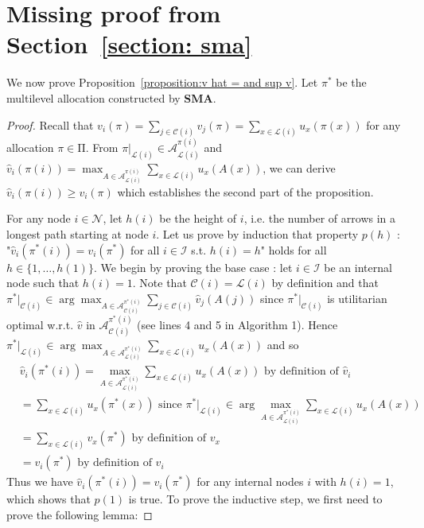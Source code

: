 \documentclass[]{article}
\newcommand{\nodes}{\mathcal{N}}
\newcommand{\children}{\mathcal{C}}
\newcommand{\leaves}{\mathcal{L}}
\newcommand{\internal}{\mathcal{I}}
\newcommand{\mallocations}{\mathrm{\Pi}}
\newcommand{\allocations}{\mathcal{A}}
\begin{document}
\section{Missing proof from Section~\ref{section: sma}} \label{appendix: missing proofs section 3}

We now prove Proposition~\ref{proposition:v hat  = and sup v}. Let $\pi^*$ be the multilevel allocation constructed by {\bf SMA}. 

\vhatsupv*

\begin{proof}
Recall that $v_i(\pi) = \sum_{j \in \children(i)} v_j(\pi) = \sum_{x \in \leaves(i)}  u_x(\pi(x))$ for any allocation $\pi \in \mallocations$. From $\pi|_{\leaves(i)} \in \allocations^{\pi(i)}_{\leaves(i)}$ and $\hat{v}_i(\pi(i)) = \max_{A \in \allocations^{\pi(i)}_{\leaves(i)}} \sum_{x \in \leaves(i)} u_x(A(x))$, we can derive $\hat{v}_i(\pi(i)) \geq v_i(\pi)$ which establishes the second part of the proposition.

For any node $i \in \nodes$, let $h(i)$ be the height of $i$, i.e. the number of arrows in a longest path starting at node $i$. Let us prove by induction that property  $p(h)$ : "$\hat{v}_i(\pi^*(i)) = v_i(\pi^*)$ for all $i\in \internal$ s.t. $h(i)=h$" holds for all $h \in \{1,\ldots, h(1)\}$. We begin by proving the base case : let $i \in \internal$ be an internal node such that $h(i)=1$. Note that $\children(i) = \leaves(i)$ by definition and that $\pi^*\vert_{\children(i)} \in \arg \max_{A \in \allocations^{\pi^*(i)}_{\children(i)}} \sum_{j \in \children(i)} \hat{v}_j(A(j))$ since $\pi^*\vert_{\children(i)}$ is utilitarian optimal w.r.t. $\hat{v}$ in $\mathcal{A}^{\pi^*(i)}_{\children(i)}$ (see lines 4 and 5 in Algorithm 1). Hence $\pi^*\vert_{\leaves(i)} \in \arg \max_{A \in \allocations^{\pi^*(i)}_{\leaves(i)}} \sum_{x \in \leaves(i)} u_x(A(x))$ and so
\begin{align*}
    & \hat{v}_i(\pi^*(i)) = \max_{A \in \allocations^{\pi^*(i)}_{\leaves(i)}}\sum_{x \in \leaves(i)} u_x(A(x)) \mbox{ by definition of }\hat{v}_i \\
    & = \sum_{x \in \leaves(i)} u_x(\pi^*(x)) \mbox{ since } \pi^*\vert_{\leaves(i)} \in \arg \max_{A \in \allocations^{\pi^*(i)}_{\leaves(i)}} \sum_{x \in \leaves(i)} u_x(A(x))\\
    & = \sum_{x \in \leaves(i)} v_x(\pi^*) \mbox{ by definition of } v_x\\
    & = v_i(\pi^*) \mbox{ by definition of } v_i
\end{align*}
Thus we have $\hat{v}_i(\pi^*(i)) =  v_i(\pi^*)$ for any internal nodes $i$ with $h(i)=1$, which
shows that $p(1)$ is true. To prove the inductive step, we first need to prove the following lemma:


\end{proof}
\end{document}
